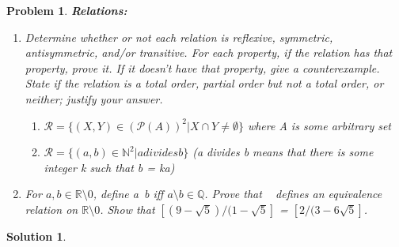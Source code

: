 \documentclass{article}
\newtheorem{problem}{Problem}
\theoremstyle{definition}
\newtheorem*{solution}{Solution}
\begin{document}
\begin{problem}
\textbf{Relations:}
\begin{enumerate}[label = \alph*)]
    \item Determine whether or not each relation is reflexive, symmetric, antisymmetric, and/or transitive. For each property, if the relation has that property, prove it. If it doesn't have that property, give a counterexample. State if the relation is a total order, partial order but not a total order, or neither; justify your answer.
    \begin{enumerate}
        \item $\mathcal{R} = \{(X,Y) \in (\mathcal{P}(A))^2 | X \cap Y \neq \emptyset \}$ where A is some arbitrary set
        
        \item $\mathcal{R} = \{(a,b) \in \mathbb{N}^2 | a divides b\}$ (a divides b means that there is some integer k such that b = ka)
    \end{enumerate}
    
    \item For $a,b \in \mathbb{R} \setminus {0}$, define a~b iff $a\setminus b \in \mathbb{Q}$. Prove that ~ defines an equivalence relation on $\mathbb{R}\setminus{0}$. Show that $[(9-\sqrt{5})/(1-\sqrt{5}]$ = $[2/(3-6\sqrt{5}]$.
\end{enumerate}
\end{problem}

\begin{solution}
\end{solution}
\end{document}
